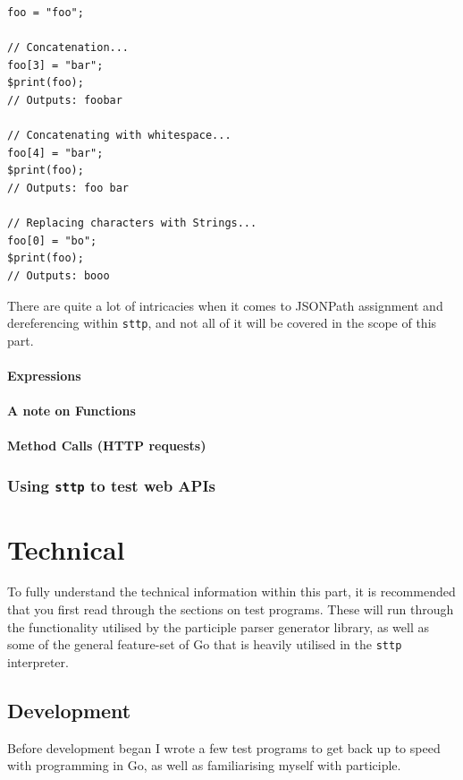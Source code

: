\documentclass[]{full}
\theoremstyle{definition}
\begin{document}
\begin{verbatim}
foo = "foo";

// Concatenation...
foo[3] = "bar";
$print(foo);
// Outputs: foobar

// Concatenating with whitespace...
foo[4] = "bar";
$print(foo);
// Outputs: foo bar

// Replacing characters with Strings...
foo[0] = "bo";
$print(foo);
// Outputs: booo
\end{verbatim}

There are quite a lot of intricacies when it comes to JSONPath assignment and dereferencing within \verb|sttp|, and not all of it will be covered in the scope of this part.

\subsection{Expressions}

\subsection{A note on Functions}

\subsection{Method Calls (HTTP requests)}

\cprotect\section{Using \verb|sttp| to test web APIs}
\label{sec:hello-sttp-using-sttp-to-test}

\part{Technical}

To fully understand the technical information within this part, it is recommended that you first read through the sections on test programs. These will run through the functionality utilised by the participle parser generator library, as well as some of the general feature-set of Go that is heavily utilised in the \verb|sttp| interpreter.

\chapter{Development}
\label{chap:development}

Before development began I wrote a few test programs to get back up to speed with programming in Go, as well as familiarising myself with participle.
\end{document}
